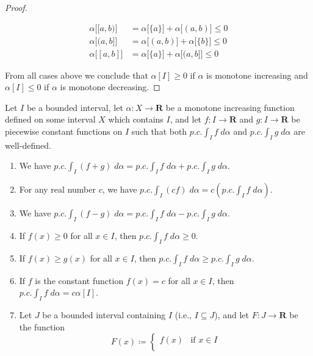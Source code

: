 \begin{proof}
\begin{itemize}
              \begin{align*}
                  \alpha\big[[a, b)\big] & = \alpha\big[\{a\}\big] + \alpha\big[(a, b)\big] \leq 0 \\
                  \alpha\big[(a, b]\big] & = \alpha\big[(a, b)\big] + \alpha\big[\{b\}\big] \leq 0 \\
                  \alpha\big[[a, b]\big] & = \alpha\big[\{a\}\big] + \alpha\big[(a, b]\big] \leq 0
              \end{align*}
    \end{itemize}
    From all cases above we conclude that \(\alpha[I] \geq 0\) if \(\alpha\) is monotone increasing and \(\alpha[I] \leq 0\) if \(\alpha\) is monotone decreasing.
\end{proof}

\begin{additional corollary}\label{ac 11.8.7}
Let \(I\) be a bounded interval, let \(\alpha : X \to \mathbf{R}\) be a monotone increasing function defined on some interval \(X\) which contains \(I\), and let \(f : I \to \mathbf{R}\) and \(g : I \to \mathbf{R}\) be piecewise constant functions on \(I\) such that both \(p.c. \int_I f \; d \alpha\) and \(p.c. \int_I g \; d \alpha\) are well-defined.
\begin{enumerate}
    \item We have \(p.c. \int_I (f + g) \; d \alpha = p.c. \int_I f \; d \alpha + p.c. \int_I g \; d \alpha\).
    \item For any real number \(c\), we have \(p.c. \int_I (cf) \; d \alpha = c (p.c. \int_I f \; d \alpha)\).
    \item We have \(p.c. \int_I (f - g) \; d \alpha = p.c. \int_I f \; d \alpha - p.c. \int_I g \; d \alpha\).
    \item If \(f(x) \geq 0\) for all \(x \in I\), then \(p.c. \int_I f \; d \alpha \geq 0\).
    \item If \(f(x) \geq g(x)\) for all \(x \in I\), then \(p.c. \int_I f \; d \alpha \geq p.c. \int_I g \; d \alpha\).
    \item If \(f\) is the constant function \(f(x) = c\) for all \(x \in I\), then \(p.c. \int_I f \; d \alpha = c \alpha[I]\).
    \item Let \(J\) be a bounded interval containing \(I\) (i.e., \(I \subseteq J\)), and let \(F : J \to \mathbf{R}\) be the function
          \[
              F(x) \coloneqq \begin{cases}
                  f(x) & \text{if } x \in I    \\

\end{cases}\]
\end{enumerate}
\end{additional corollary}
